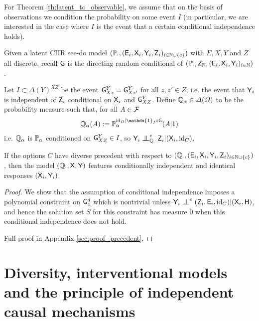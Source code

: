 For Theorem \ref{th:latent_to_observable}, we assume that on the basis of observations we condition the probability on some event $I$ (in particular, we are interested in the case where $I$ is the event that a certain conditional independence holds).

\begin{theorem}\label{th:latent_to_observable}
Given a latent CIIR see-do model $(\mathbb{P}_\cdot,(\mathsf{E}_i,\mathsf{X}_i,\mathsf{Y}_i,\mathsf{Z}_i)_{i\in\mathbb{N}\cup\{c\}})$ with $E,X,Y$ and $Z$ all discrete, recall $\mathsf{G}$ is the directing random conditional of $(\mathbb{P}_\cdot,\mathsf{Z}_{\mathbb{N}},(\mathsf{E}_i,\mathsf{X}_i,\mathsf{Y}_i)_{i\in \mathbb{N}})$.

Let $I\subset \Delta(Y)^{XZ}$ be the event $\mathsf{G}^Y_{Xz}=\mathsf{G}^Y_{Xz'}$ for all $z,z'\in Z$; i.e. the event that $\mathsf{Y}_i$ is independent of $\mathsf{Z}_i$ conditional on $\mathsf{X}_i$ and $\mathsf{G}^Y_{XZ}$. Define $\mathbb{Q}_\alpha\in \Delta(\Omega)$ to be the probability measure such that, for all $A\in \mathcal{F}$
\begin{align}
\prob{Q}_\alpha(A) := \prob{P}_\alpha^{\mathrm{id}_\Omega|\mathds{1}_I\circ \RV{G}}(A|1)
\end{align}
i.e. $\mathbb{Q}_\alpha$ is $\mathbb{P}_\alpha$ conditioned on $\mathsf{G}^Y_{XZ}\in I$, so $\RV{Y}_i\CI^e_{\prob{Q}_\cdot} \RV{Z}_i|(\RV{X}_i,\mathrm{id}_C)$.

If the options $C$ have diverse precedent with respect to $(\mathbb{Q}_\cdot,(\mathsf{E}_i,\mathsf{X}_i,\mathsf{Y}_i,\mathsf{Z}_i)_{i\in\mathbb{N}\cup\{c\}})$, then the model $(\mathbb{Q}_\cdot,\mathsf{X},\mathsf{Y})$ features conditionally independent and identical responses $(\mathsf{X}_i,\mathsf{Y}_i)$.
\end{theorem}

\begin{proof}
We show that the assumption of conditional independence imposes a polynomial constraint on $\mathsf{G}^d_z$ which is nontrivial unless $\RV{Y}_i\CI^e (\RV{Z}_i,\RV{E}_i,\text{id}_C)|(\RV{X}_i,\RV{H})$, and hence the solution set $S$ for this constraint has measure 0 when this conditional independence does not hold.

Full proof in Appendix \ref{sec:proof_precedent}.
\end{proof}

\section[Independent mechanisms]{Diversity, interventional models and the principle of independent causal mechanisms}

